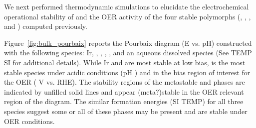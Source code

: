 %


We next performed  thermodynamic simulations to elucidate the electrochemical operational stability of \IrOx and the OER activity of the four stable polymorphs (\rIrOtwo, \aIrOthree, \rIrOthree, and \bIrOthree) computed previously.


%
%
Figure~\ref{fig:bulk_pourbaix} reports the \IrOx Pourbaix diagram (E vs. pH) constructed with the following species: Ir, \rIrOtwo, \aIrOthree,  \rIrOthree, \bIrOthree, and an aqueous dissolved  species (See TEMP SI for additional details).
%
While Ir and \rIrOtwo are most stable at low bias, \aIrOthree is the most stable species under acidic conditions (pH ) and in the bias region of interest for the OER ( V vs. RHE).
%
%
The stability regions of the metastable \rIrOthree and \bIrOthree phases are indicated by unfilled solid lines and appear (meta?)stable in the OER relevant region of the diagram.
%
The similar formation energies (SI TEMP) for all three \IrOthree species suggest some or all of these \IrOthree phases may be present and are stable under OER conditions.

